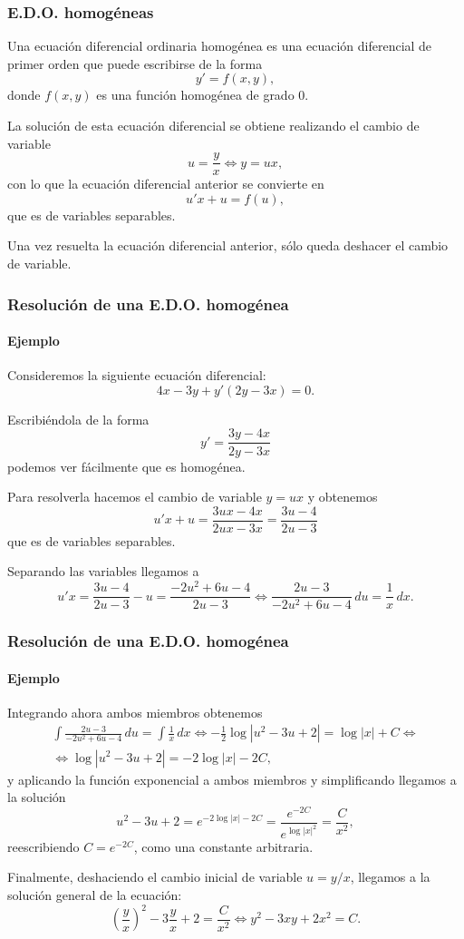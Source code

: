 \begin{frame}
\frametitle{E.D.O. homogéneas}
\begin{definicion}[E.D.O. homogénea]
Una ecuación diferencial ordinaria homogénea es una ecuación diferencial de primer orden que puede escribirse de la forma 
\[y'=f(x,y),\]
donde $f(x,y)$ es una función homogénea de grado $0$.
\end{definicion}

La solución de esta ecuación diferencial se obtiene realizando el cambio de variable
\[
u=\frac{y}{x}\Leftrightarrow y=ux,
\]
con lo que la ecuación diferencial anterior se convierte en 
\[
u'x+u=f(u),
\]
que es de variables separables.

Una vez resuelta la ecuación diferencial anterior, sólo queda deshacer el cambio de variable.
\end{frame}


\begin{frame}
\frametitle{Resolución de una E.D.O. homogénea}
\framesubtitle{Ejemplo}
Consideremos la siguiente ecuación diferencial: 
\[
4x-3y+y'(2y-3x)=0.
\]

Escribiéndola de la forma
\[
y'=\frac{3y-4x}{2y-3x}
\]
podemos ver fácilmente que es homogénea.

Para resolverla hacemos el cambio de variable $y=ux$ y obtenemos
\[
u'x+u=\frac{3ux-4x}{2ux-3x}=\frac{3u-4}{2u-3}
\]
que es de variables separables.

Separando las variables llegamos a
\[
u'x=\frac{3u-4}{2u-3}-u=\frac{-2u^2+6u-4}{2u-3}\Leftrightarrow \frac{2u-3}{-2u^2+6u-4}\,du=\frac{1}{x}\,dx.
\]
\end{frame}


\begin{frame}
\frametitle{Resolución de una E.D.O. homogénea}
\framesubtitle{Ejemplo}
Integrando ahora ambos miembros obtenemos
\[
\renewcommand{\arraystretch}{2}
\begin{array}{c}
\displaystyle \int \frac{2u-3}{-2u^2+6u-4}\,du=\int \frac{1}{x}\,dx
\Leftrightarrow -\frac{1}{2}\log|u^2-3u+2|=\log|x|+C \Leftrightarrow\\
\Leftrightarrow \log|u^2-3u+2|=-2\log|x|-2C,
\end{array}
\]
y aplicando la función exponencial a ambos miembros y simplificando llegamos a la solución 
\[
u^2-3u+2=e^{-2\log|x|-2C}=\frac{e^{-2C}}{e^{\log|x|^2}}=\frac{C}{x^2},
\]
reescribiendo $C=e^{-2C}$, como una constante arbitraria.

Finalmente, deshaciendo el cambio inicial de variable $u=y/x$, llegamos a la solución general de la ecuación:
\[
\left(\frac{y}{x}\right)^2-3\frac{y}{x}+2=\frac{C}{x^2}\Leftrightarrow y^2-3xy+2x^2=C.
\]
\end{frame}



